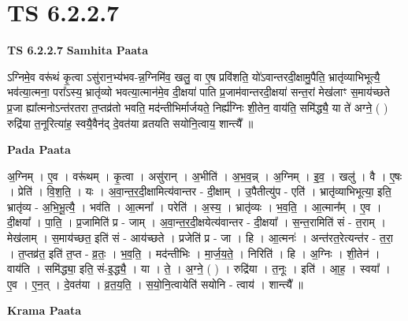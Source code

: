 \documentclass[17pt]{extarticle}
\begin{document}
\section{ TS 6.2.2.7 }

\textbf{TS 6.2.2.7 } \newline
\textbf{Samhita Paata} \newline

ऽग्निमे॒व वरू॑थं कृ॒त्वा ऽसु॑रान॒भ्य॑भव-न्न॒ग्निमि॑व॒ खलु॒ वा ए॒ष प्रवि॑शति॒ यो॑ऽवान्तरदी॒क्षामु॒पैति॒ भ्रातृ॑व्याभिभूत्यै॒ भव॑त्या॒त्मना॒ परा᳚ऽस्य॒ भ्रातृ॑व्यो भवत्या॒त्मान॑मे॒व दी॒क्षया॑ पाति प्र॒जाम॑वान्तरदी॒क्षया॑ सन्त॒रां मेख॑लाꣳ स॒माय॑च्छते प्र॒जा ह्या᳚त्मनोऽन्त॑रतरा त॒प्तव्र॑तो भवति॒ मद॑न्तीभिर्मार्जयते॒ निर्ह्य॑ग्निः शी॒तेन॒ वाय॑ति॒ समि॑द्ध्यै॒ या ते॑ अग्ने॒ ( ) रुद्रि॑या त॒नूरित्या॑ह॒ स्वयै॒वैन॑द् दे॒वत॑या व्रतयति सयोनि॒त्वाय॒ शान्त्यै᳚ ॥ \newline

\textbf{Pada Paata} \newline

अ॒ग्निम् । ए॒व । वरू॑थम् । कृ॒त्वा । असु॑रान् । अ॒भीति॑ । अ॒भ॒व॒न्न् । अ॒ग्निम् । इ॒व॒ । खलु॑ । वै । ए॒षः । प्रेति॑ । वि॒श॒ति॒ । यः । अ॒वा॒न्त॒र॒दी॒क्षामित्य॑वान्तर - दी॒क्षाम् । उ॒पैतीत्यु॑प - एति॑ । भ्रातृ॑व्याभिभूत्या॒ इति॒ भ्रातृ॑व्य - अ॒भि॒भू॒त्यै॒ । भव॑ति । आ॒त्मना᳚ । परेति॑ । अ॒स्य॒ । भ्रातृ॑व्यः । भ॒व॒ति॒ । आ॒त्मान᳚म् । ए॒व । दी॒क्षया᳚ । पा॒ति॒ । प्र॒जामिति॑ प्र - जाम् । अ॒वा॒न्त॒र॒दी॒क्षयेत्य॑वान्तर - दी॒क्षया᳚ । स॒न्त॒रामिति॑ सं - त॒राम् । मेख॑लाम् । स॒माय॑च्छत॒ इति॑ सं - आय॑च्छते । प्रजेति॑ प्र - जा । हि । आ॒त्मनः॑ । अन्त॑रत॒रेत्यन्त॑र - त॒रा॒ । त॒प्तव्र॑त॒ इति॑ त॒प्त - व्र॒तः॒ । भ॒व॒ति॒ । मद॑न्तीभिः । मा॒र्ज॒य॒ते॒ । निरिति॑ । हि । अ॒ग्निः । शी॒तेन॑ । वाय॑ति । समि॑द्ध्या॒ इति॒ सं-इ॒द्ध्यै॒ । या । ते॒ । अ॒ग्ने॒ ( ) । रुद्रि॑या । त॒नूः । इति॑ । आ॒ह॒ । स्वया᳚ । ए॒व । ए॒न॒त् । दे॒वत॑या । व्र॒त॒य॒ति॒ । स॒यो॒नि॒त्वायेति॑ सयोनि - त्वाय॑ । शान्त्यै᳚ ॥  \newline


\textbf{Krama Paata} \newline
\end{document}
